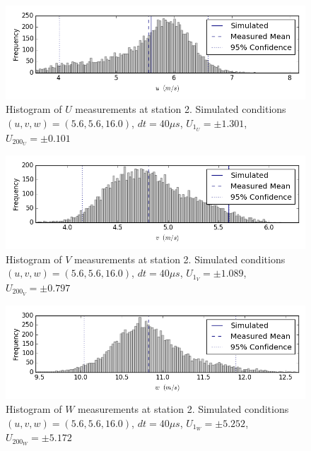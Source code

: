 \begin{figure}[H]
\centering
\includegraphics[width=6in]{figs/Ely_May28th02002/uncertainty_Ely_May28th02002_U}
\caption{Histogram of $U$ measurements at station 2. Simulated conditions $(u,v,w)=(5.6, 5.6, 16.0)$, $dt=40 \mu s$, $U_1_U=\pm 1.301$, $U_200_U=\pm 0.101$}
\label{fig:uncertainty_Ely_May28th02002_U}
\end{figure}


\begin{figure}[H]
\centering
\includegraphics[width=6in]{figs/Ely_May28th02002/uncertainty_Ely_May28th02002_V}
\caption{Histogram of $V$ measurements at station 2. Simulated conditions $(u,v,w)=(5.6, 5.6, 16.0)$, $dt=40 \mu s$, $U_1_V=\pm 1.089$, $U_200_V=\pm 0.797$}
\label{fig:uncertainty_Ely_May28th02002_V}
\end{figure}


\begin{figure}[H]
\centering
\includegraphics[width=6in]{figs/Ely_May28th02002/uncertainty_Ely_May28th02002_W}
\caption{Histogram of $W$ measurements at station 2. Simulated conditions $(u,v,w)=(5.6, 5.6, 16.0)$, $dt=40 \mu s$, $U_1_W=\pm 5.252$, $U_200_W=\pm 5.172$}
\label{fig:uncertainty_Ely_May28th02002_W}
\end{figure}


